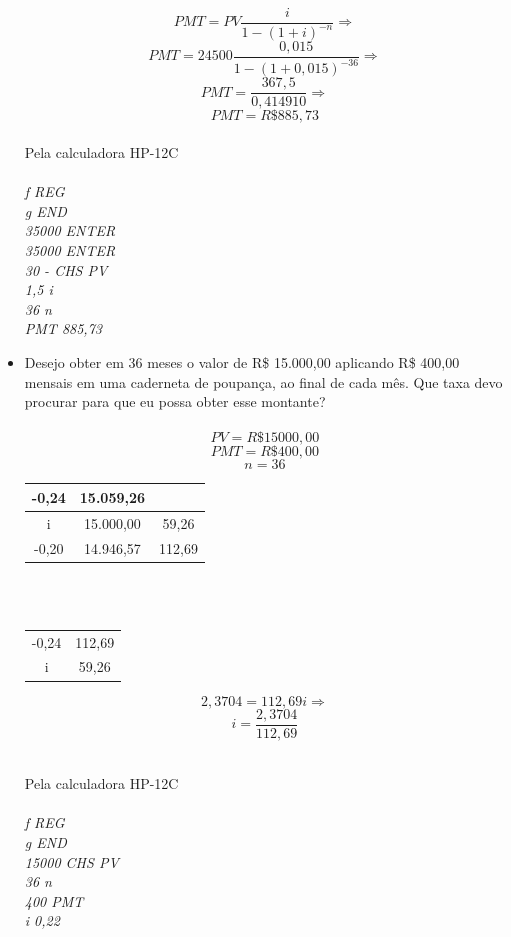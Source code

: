 \documentclass[a4paper, 12pt]{article}
\begin{document}
\begin{itemize}
\\
$$ PMT = PV\frac{i}{1-(1+i)^{-n}} \Rightarrow $$
$$ PMT = 24500\frac{0,015}{1-(1+0,015)^{-36}} \Rightarrow $$
$$ PMT = \frac{367,5}{0,414910} \Rightarrow $$
$$ \boxed{PMT = R\$885,73} $$
\\
Pela calculadora HP-12C\\\\
\emph{f REG}\\
\emph{g END}\\
\emph{35000 ENTER}\\
\emph{35000 ENTER}\\
\emph{30  \div - CHS PV} \\
\emph{1,5 i} \\
\emph{36 n}\\
\emph{PMT 885,73}\\

\item Desejo obter em 36 meses o valor de R\$ 15.000,00 aplicando R\$ 400,00 
mensais em uma caderneta de poupança, ao final de cada mês. Que taxa devo 
procurar para que eu possa obter esse montante? \\\\


$$ PV = R\$15000,00 $$
$$ PMT = R\$400,00 $$
$$ n = 36 $$

  \begin{tabular}{ | c | c | c |}
  \hline
    -0,24 & 15.059,26 & \\ \hline
    i & 15.000,00 & 59,26 \\ \hline
    -0,20 & 14.946,57 & 112,69 \\ \hline  
  \end{tabular} \\\\

  \begin{tabular}{ c c }
    -0,24 & 112,69 \\ 
    i & 59,26 \\ 
  \end{tabular} 
  
$$ 2,3704 = 112,69i \Rightarrow $$
$$ i = \frac{2,3704}{112,69} $$
$$ 

Pela calculadora HP-12C\\\\
\emph{f REG}\\
\emph{g END}\\
\emph{15000 CHS PV}\\
\emph{36 n}\\
\emph{400 PMT}\\
\emph{i 0,22}  


\end{itemize}
\end{document}
